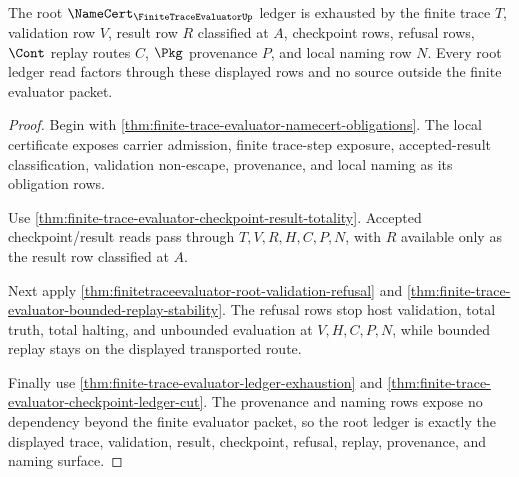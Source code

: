 \begin{theorem}
\label{thm:finite-trace-evaluator-namecert-root-ledger-factorization}
The root $\NameCert_{\FiniteTraceEvaluatorUp}$ ledger is exhausted by the finite trace $T$, validation row $V$, result row $R$ classified at $A$, checkpoint rows, refusal rows, $\Cont$ replay routes $C$, $\Pkg$ provenance $P$, and local naming row $N$. Every root ledger read factors through these displayed rows and no source outside the finite evaluator packet.
\end{theorem}
\begin{proof}
Begin with \autoref{thm:finite-trace-evaluator-namecert-obligations}. The local certificate exposes carrier admission, finite trace-step exposure, accepted-result classification, validation non-escape, provenance, and local naming as its obligation rows.

Use \autoref{thm:finite-trace-evaluator-checkpoint-result-totality}. Accepted checkpoint/result reads pass through $T,V,R,H,C,P,N$, with $R$ available only as the result row classified at $A$.

Next apply \autoref{thm:finitetraceevaluator-root-validation-refusal} and \autoref{thm:finite-trace-evaluator-bounded-replay-stability}. The refusal rows stop host validation, total truth, total halting, and unbounded evaluation at $V,H,C,P,N$, while bounded replay stays on the displayed transported route.

Finally use \autoref{thm:finite-trace-evaluator-ledger-exhaustion} and \autoref{thm:finite-trace-evaluator-checkpoint-ledger-cut}. The provenance and naming rows expose no dependency beyond the finite evaluator packet, so the root ledger is exactly the displayed trace, validation, result, checkpoint, refusal, replay, provenance, and naming surface.
\end{proof}
